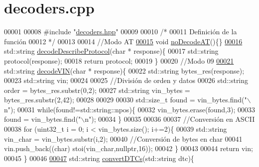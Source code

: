 \hypertarget{decoders_8cpp_source}{}\section{decoders.\+cpp}
\label{decoders_8cpp_source}

\begin{DoxyCode}
00001 
00008 \textcolor{preprocessor}{#include "\hyperlink{decoders_8hpp}{decoders.hpp}"}
00009 
00010 \textcolor{comment}{/*}
00011 \textcolor{comment}{Definición de la función}
00012 \textcolor{comment}{*/}
00013 
00014 \textcolor{comment}{//Modo AT}
\hyperlink{decoders_8hpp_a8ee851a37675f190ea728d6b2f0cdc92}{00015} \textcolor{keywordtype}{void} \hyperlink{decoders_8cpp_a8ee851a37675f190ea728d6b2f0cdc92}{noDecodeAT}()\{\}
\hyperlink{decoders_8hpp_ab83ce79cd098ea655f3812488e304a0c}{00016} std::string \hyperlink{decoders_8cpp_ab83ce79cd098ea655f3812488e304a0c}{decodeDescribeProtocol}(\textcolor{keywordtype}{char} * response)\{
00017     std::string protocol(response);
00018     \textcolor{keywordflow}{return} protocol;
00019 \}
00020 \textcolor{comment}{//Modo 09}
\hyperlink{decoders_8hpp_a66754738119854c13a74265e209083e4}{00021} std::string \hyperlink{decoders_8cpp_a66754738119854c13a74265e209083e4}{decodeVIN}(\textcolor{keywordtype}{char} * response)\{
00022     std::string bytes\_res(response);
00023     std::string vin;
00024 
00025     \textcolor{comment}{//División de orden y datos}
00026     std::string order = bytes\_res.substr(0,2);
00027     std::string vin\_bytes = bytes\_res.substr(2,42);
00028 
00029 
00030     std::size\_t found = vin\_bytes.find(\textcolor{stringliteral}{"\(\backslash\)n"});
00031     \textcolor{keywordflow}{while}(found!=std::string::npos)\{
00032         vin\_bytes.erase(found,3);
00033         found = vin\_bytes.find(\textcolor{stringliteral}{"\(\backslash\)n"});
00034     \}
00035 
00036 
00037     \textcolor{comment}{//Conversión en ASCII}
00038     \textcolor{keywordflow}{for} (uint32\_t i = 0; i < vin\_bytes.size(); i+=2)\{
00039         std::string vin\_char = vin\_bytes.substr(i,2);
00040         \textcolor{comment}{//Conversión de bytes en char}
00041         vin.push\_back((\textcolor{keywordtype}{char}) stoi(vin\_char,\textcolor{keyword}{nullptr},16));
00042     \}
00043 
00044     \textcolor{keywordflow}{return} vin; 
00045 \}
00046 
\hyperlink{decoders_8hpp_a4f18f411252f4c60fae4af320989c262}{00047} std::string \hyperlink{decoders_8cpp_a4f18f411252f4c60fae4af320989c262}{convertDTCs}(std::string dtc)\{

\end{DoxyCode}
